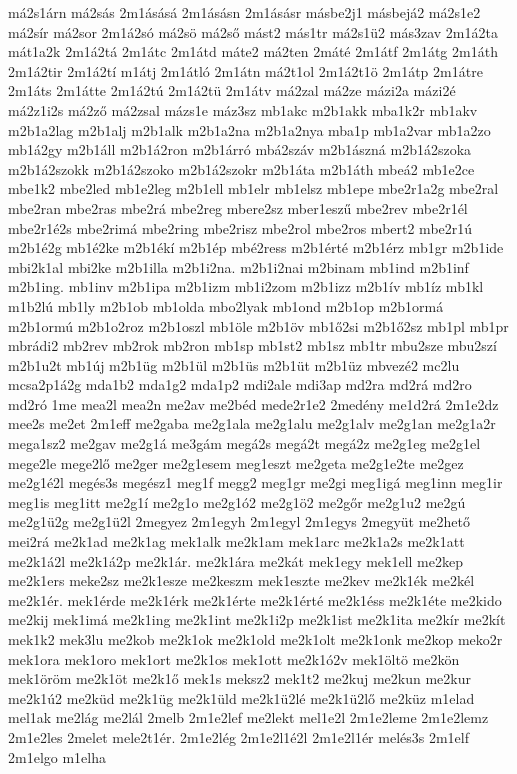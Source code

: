 {má2s1árn
má2sás
2m1ásásá
2m1ásásn
2m1ásásr
másbe2j1
másbejá2
má2s1e2
má2sír
má2sor
2m1á2só
má2sö
má2ső
mást2
más1tr
má2s1ü2
más3zav
2m1á2ta
mát1a2k
2m1á2tá
2m1átc
2m1átd
máte2
má2ten
2máté
2m1átf
2m1átg
2m1áth
2m1á2tir
2m1á2tí
m1átj
2m1átló
2m1átn
má2t1ol
2m1á2t1ö
2m1átp
2m1átre
2m1áts
2m1átte
2m1á2tú
2m1á2tü
2m1átv
má2zal
má2ze
mázi2a
mázi2é
má2z1i2s
má2ző
má2zsal
mázs1e
máz3sz
mb1akc
m2b1akk
mba1k2r
mb1akv
m2b1a2lag
m2b1alj
m2b1alk
m2b1a2na
m2b1a2nya
mba1p
mb1a2var
mb1a2zo
mb1á2gy
m2b1áll
m2b1á2ron
m2b1árró
mbá2száv
m2b1ászná
m2b1á2szoka
m2b1á2szokk
m2b1á2szoko
m2b1á2szokr
m2b1áta
m2b1áth
mbeá2
mb1e2ce
mbe1k2
mbe2led
mb1e2leg
m2b1ell
mb1elr
mb1elsz
mb1epe
mbe2r1a2g
mbe2ral
mbe2ran
mbe2ras
mbe2rá
mbe2reg
mbere2sz
mber1eszű
mbe2rev
mbe2r1él
mbe2r1é2s
mbe2rimá
mbe2ring
mbe2risz
mbe2rol
mbe2ros
mbert2
mbe2r1ú
m2b1é2g
mb1é2ke
m2b1ékí
m2b1ép
mbé2ress
m2b1érté
m2b1érz
mb1gr
m2b1ide
mbi2k1al
mbi2ke
m2b1illa
m2b1i2na.
m2b1i2nai
m2binam
mb1ind
m2b1inf
m2b1ing.
mb1inv
m2b1ipa
m2b1izm
mb1i2zom
m2b1izz
m2b1ív
mb1íz
mb1kl
m1b2lú
mb1ly
m2b1ob
mb1olda
mbo2lyak
mb1ond
m2b1op
m2b1ormá
m2b1ormú
m2b1o2roz
m2b1oszl
mb1öle
m2b1öv
mb1ő2si
m2b1ő2sz
mb1pl
mb1pr
mbrádi2
mb2rev
mb2rok
mb2ron
mb1sp
mb1st2
mb1sz
mb1tr
mbu2sze
mbu2szí
m2b1u2t
mb1új
m2b1üg
m2b1ül
m2b1üs
m2b1üt
m2b1üz
mbvezé2
mc2lu
mcsa2p1á2g
mda1b2
mda1g2
mda1p2
mdi2ale
mdi3ap
md2ra
md2rá
md2ro
md2ró
1me
mea2l
mea2n
me2av
me2béd
mede2r1e2
2medény
me1d2rá
2m1e2dz
mee2s
me2et
2m1eff
me2gaba
me2g1ala
me2g1alu
me2g1alv
me2g1an
me2g1a2r
mega1sz2
me2gav
me2g1á
me3gám
megá2s
megá2t
megá2z
me2g1eg
me2g1el
mege2le
mege2lő
me2ger
me2g1esem
meg1eszt
me2geta
me2g1e2te
me2gez
me2g1é2l
megés3s
megész1
meg1f
megg2
meg1gr
me2gi
meg1igá
meg1inn
meg1ir
meg1is
meg1itt
me2g1í
me2g1o
me2g1ó2
me2g1ö2
me2gőr
me2g1u2
me2gú
me2g1ü2g
me2g1ü2l
2megyez
2m1egyh
2m1egyl
2m1egys
2megyüt
me2hető
mei2rá
me2k1ad
me2k1ag
mek1alk
me2k1am
mek1arc
me2k1a2s
me2k1att
me2k1á2l
me2k1á2p
me2k1ár.
me2k1ára
me2kát
mek1egy
mek1ell
me2kep
me2k1ers
meke2sz
me2k1esze
me2keszm
mek1eszte
me2kev
me2k1ék
me2kél
me2k1ér.
mek1érde
me2k1érk
me2k1érte
me2k1érté
me2k1éss
me2k1éte
me2kido
me2kij
mek1imá
me2k1ing
me2k1int
me2k1i2p
me2k1ist
me2k1ita
me2kír
me2kít
mek1k2
mek3lu
me2kob
me2k1ok
me2k1old
me2k1olt
me2k1onk
me2kop
meko2r
mek1ora
mek1oro
mek1ort
me2k1os
mek1ott
me2k1ó2v
mek1öltö
me2kön
mek1öröm
me2k1öt
me2k1ő
mek1s
meksz2
mek1t2
me2kuj
me2kun
me2kur
me2k1ú2
me2küd
me2k1üg
me2k1üld
me2k1ü2lé
me2k1ü2lő
me2küz
m1elad
mel1ak
me2lág
me2lál
2melb
2m1e2lef
me2lekt
mel1e2l
2m1e2leme
2m1e2lemz
2m1e2les
2melet
mele2t1ér.
2m1e2lég
2m1e2l1é2l
2m1e2l1ér
melés3s
2m1elf
2m1elgo
m1elha
}
